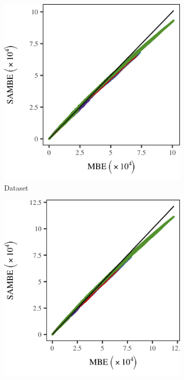 		\begin{figure}
			\centering
			\begin{subfigure}{0.3\textwidth}
				\centering
				\includegraphics[keepaspectratio=true, width=\textwidth, height=0.23\textheight]{discussion/img/ferdosi_3_120000_mbe_sambe.png}
				\caption{Dataset \ferdosiThree}
				\label{fig:discussion:performance:mbevssambe:ferdosi3}
			\end{subfigure}
			\begin{subfigure}{0.3\textwidth}
				\centering
				\includegraphics[keepaspectratio=true, width=\textwidth, height=0.23\textheight]{discussion/img/baakman_3_120000_mbe_sambe.png}

\end{subfigure}
\end{figure}
